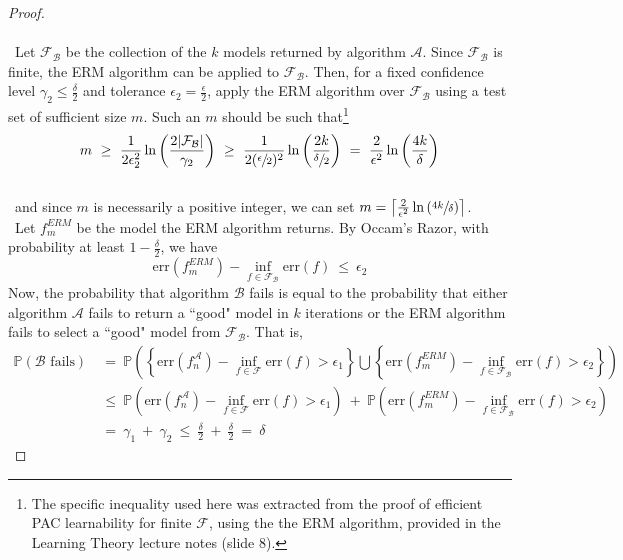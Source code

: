 \documentclass[twoside,11pt]{homework}
\DeclarePairedDelimiter{\2norm}{\lVert}{\rVert^2_2}
\newcommand{\1}[1]{\mathds{1}\left[#1\right]}
\begin{document}
\begin{proof}
\\\ \\\
Let $\mathcal{F_{\mathcal{B}}}$ be the collection of the $k$ models returned by algorithm $\mathcal{A}$. Since $\mathcal{F_{\mathcal{B}}}$ is finite, the ERM algorithm can be applied to $\mathcal{F_{\mathcal{B}}}$. Then, for a fixed confidence level $\gamma_2 \leq \frac{\delta}{2}$ and tolerance $\epsilon_2 = \frac{\epsilon}{2}$, apply the ERM algorithm over $\mathcal{F_{\mathcal{B}}}$ using a test set of sufficient size $m$. Such an $m$ should be such that\footnote{The specific inequality used here was extracted from the proof of efficient PAC learnability for finite $\mathcal{F}$, using the the ERM algorithm, provided in the Learning Theory lecture notes (slide 8).}
$$m \ \geq \ \frac{1}{2\epsilon_2^2}\ln\left(\frac{2|\mathcal{F_{\mathcal{B}}}|}{\gamma_2}\right) \ \geq \ \frac{1}{2(\sfrac{\epsilon}{2})^2}\ln\left(\frac{2k}{\sfrac{\delta}{2}}\right) \ = \ \frac{2}{\epsilon^2}\ln\left(\frac{4k}{\delta}\right)$$ 
\\\
and since $m$ is necessarily a positive integer, we can set $m = \left\lceil\frac{2}{\epsilon^2}\ln\left(\sfrac{4k}{\delta}\right)\right\rceil$.  \\\
Let $f_m^{ERM}$ be the model the ERM algorithm returns. By Occam's Razor, with probability at least $1 - \frac{\delta}{2}$, we have
\begin{equation}\label{ineq2}
\text{err}(f_m^{ERM}) - \inf_{f \in \mathcal{F_{\mathcal{B}}}}\text{err}(f) \ \leq \ \epsilon_2
\end{equation}
Now, the probability that algorithm $\mathcal{B}$ fails is equal to the probability that either algorithm $\mathcal{A}$ fails to return a ``good" model in $k$ iterations or the ERM algorithm fails to select a ``good" model from $\mathcal{F}_{\mathcal{B}}$. That is,
\begin{align*}
\mathbb{P}(\mathcal{B} \text{ fails}) \ &= \ \mathbb{P}\left(\left\lbrace\text{err}(f_n^{\mathcal{A}}) - \inf_{f \in \mathcal{F}}\text{err}(f)  > \epsilon_1\right\rbrace \bigcup  \left\lbrace\text{err}(f_m^{ERM}) - \inf_{f \in \mathcal{F_{\mathcal{B}}}}\text{err}(f)  > \epsilon_2\right\rbrace \right)\\[0.8em]
& \leq \ \mathbb{P}\left(\text{err}(f_n^{\mathcal{A}}) - \inf_{f \in \mathcal{F}}\text{err}(f)  > \epsilon_1\right) \ + \  \mathbb{P}\left(\text{err}(f_m^{ERM}) - \inf_{f \in \mathcal{F_{\mathcal{B}}}}\text{err}(f)  > \epsilon_2\right)\\[0.8em]
& = \ \gamma_1 \ + \ \gamma_2 \ \leq \ \frac{\delta}{2} \ + \ \frac{\delta}{2} \ = \ \delta

\end{align*}
\end{proof}
\end{document}
